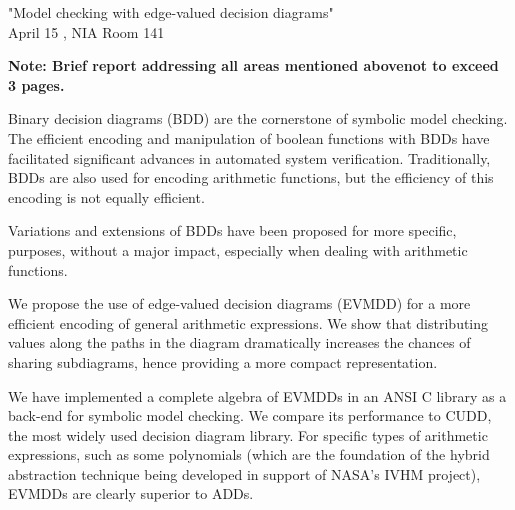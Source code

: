 \documentclass[a4paper,oneside,12pt,pdftex]{article}
\begin{document}
\noindent "Model checking with edge-valued decision diagrams"\\
April 15 , NIA Room 141

\clearpage

\noindent\textbf{Note: Brief report addressing all areas mentioned abovenot to exceed 3 pages.}
\vspace{0.8cm}

\noindent Binary decision diagrams (BDD) are the cornerstone of symbolic model checking. The 
efficient encoding and manipulation of boolean functions with BDDs have facilitated significant 
advances in automated system verification. Traditionally, BDDs are also used for encoding 
arithmetic functions, but the efficiency of this encoding is not equally efficient.

\vspace{0.8cm}

\noindent Variations and extensions of BDDs have been proposed for more specific, purposes, 
without a major impact, especially when dealing with arithmetic functions.

\vspace{0.8cm}

\noindent We propose the use of edge-valued decision diagrams (EVMDD) for a more efficient 
encoding of general arithmetic expressions. We show that distributing values along the paths in 
the diagram dramatically increases the chances of sharing subdiagrams, hence providing a more 
compact representation.

\vspace{0.8cm}

\noindent We have implemented a complete algebra of EVMDDs in an ANSI C library as a back-end 
for symbolic model checking. We compare its performance to CUDD, the most widely used decision 
diagram library. For specific types of arithmetic expressions, such as some polynomials (which 
are the foundation of the hybrid abstraction technique being developed in support of NASA's IVHM 
project), EVMDDs are clearly superior to ADDs.
\end{document}
